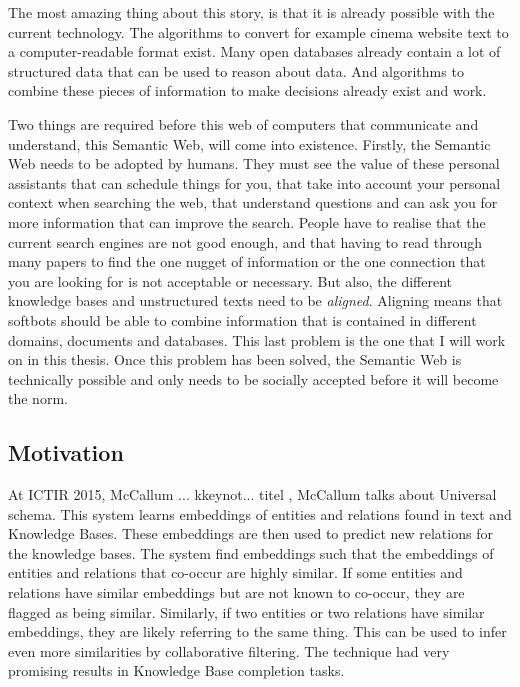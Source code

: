 \documentclass{article}
\begin{document}
 The most amazing thing about this story, is that it is already possible with the current technology. The algorithms to convert for example cinema website text to a computer-readable format exist. Many open databases already contain a lot of structured data that can be used to reason about data. And algorithms to combine these pieces of information to make decisions already exist and work.
 
 Two things are required before this web of computers that communicate and understand, this Semantic Web, will come into existence. 
 Firstly, the Semantic Web needs to be adopted by humans. They must see the value of these personal assistants that can schedule things for you, that take into account your personal context when searching the web, that understand questions and can ask you for more information that can improve the search. People have to realise that the current search engines are not good enough, and that having to read through many papers to find the one nugget of information or the one connection that you are looking for is not acceptable or necessary.
 But also, the different knowledge bases and unstructured texts need to be \emph{aligned}. Aligning means that softbots should be able to combine information that is contained in different domains, documents and databases. This last problem is the one that I will work on in this thesis. Once this problem has been solved, the Semantic Web is technically possible and only needs to be socially accepted before it will become the norm.

 \subsection{Motivation} %
 At ICTIR 2015, McCallum ... kkeynot... titel \cite{mccallumweblecture}, McCallum talks about Universal schema. This system learns embeddings of entities and relations found in text and Knowledge Bases. These embeddings are then used to predict new relations for the knowledge bases. The system find embeddings such that the embeddings of entities and relations that co-occur are highly similar. If some entities and relations have similar embeddings but are not known to co-occur, they are flagged as being similar. Similarly, if two entities or two relations have similar embeddings, they are likely referring to the same thing. This can be used to infer even more similarities by collaborative filtering. The technique had very promising results in Knowledge Base completion tasks.
 
\end{document}
